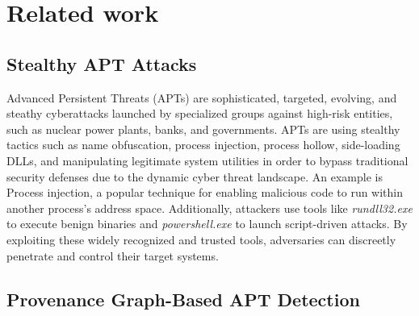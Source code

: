 \section{Related work}

\subsection{Stealthy APT Attacks}

Advanced Persistent Threats (APTs) are sophisticated, targeted, evolving, and steathy cyberattacks launched by specialized groups against high-risk entities, such as nuclear power plants, banks, and governments. APTs are using stealthy tactics such as name obfuscation\cite{cybereason2023,checkpoint2021,intrinsec}, process injection\cite{checkpoint2020,fsecure2019}, process hollow\cite{secureworks}, side-loading DLLs\cite{mitre_g0022,mitre_g0016}, and manipulating legitimate system utilities in order to bypass traditional security defenses due to the dynamic cyber threat landscape\cite{barr2021survivalism}. An example is Process injection, a popular technique for enabling malicious code to run within another process's address space.  Additionally, attackers use tools like \textit{rundll32.exe} to execute benign binaries and \textit{powershell.exe} to launch script-driven attacks\cite{li2019effective}. By exploiting these widely recognized and trusted tools, adversaries can discreetly penetrate and control their target systems.

\subsection{Provenance Graph-Based APT Detection}



